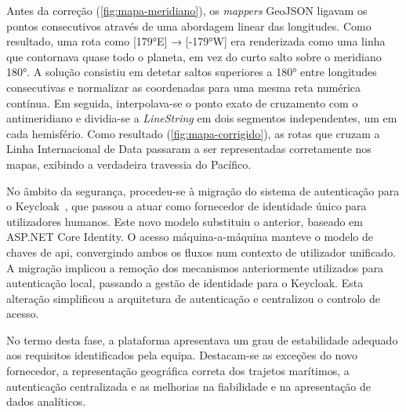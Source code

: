 Antes da correção (\autoref{fig:mapa-meridiano}), os \textit{mappers} GeoJSON ligavam os pontos consecutivos através de uma abordagem linear das longitudes. Como resultado, uma rota como [179°E] → [-179°W] era renderizada como uma linha que contornava quase todo o planeta, em vez do curto salto sobre o meridiano 180°. A solução consistiu em detetar saltos superiores a 180° entre longitudes consecutivas e normalizar as coordenadas para uma mesma reta numérica contínua. Em seguida, interpolava-se o ponto exato de cruzamento com o antimeridiano e dividia-se a \textit{LineString} em dois segmentos independentes, um em cada hemisfério. Como resultado (\autoref{fig:mapa-corrigido}), as rotas que cruzam a Linha Internacional de Data passaram a ser representadas corretamente nos mapas, exibindo a verdadeira travessia do Pacífico.

No âmbito da segurança, procedeu-se à migração do sistema de autenticação para o Keycloak~\cite{keycloak}, que passou a atuar como fornecedor de identidade único para utilizadores humanos. Este novo modelo substituiu o anterior, baseado em ASP.NET Core Identity. O acesso máquina-a-máquina manteve o modelo de chaves de \gls{api}, convergindo ambos os fluxos num contexto de utilizador unificado. A migração implicou a remoção dos mecanismos anteriormente utilizados para autenticação local, passando a gestão de identidade para o Keycloak. Esta alteração simplificou a arquitetura de autenticação e centralizou o controlo de acesso.

No termo desta fase, a plataforma apresentava um grau de estabilidade adequado aos requisitos identificados pela equipa. Destacam-se as exceções do novo fornecedor, a representação geográfica correta dos trajetos marítimos, a autenticação centralizada e as melhorias na fiabilidade e na apresentação de dados analíticos.

